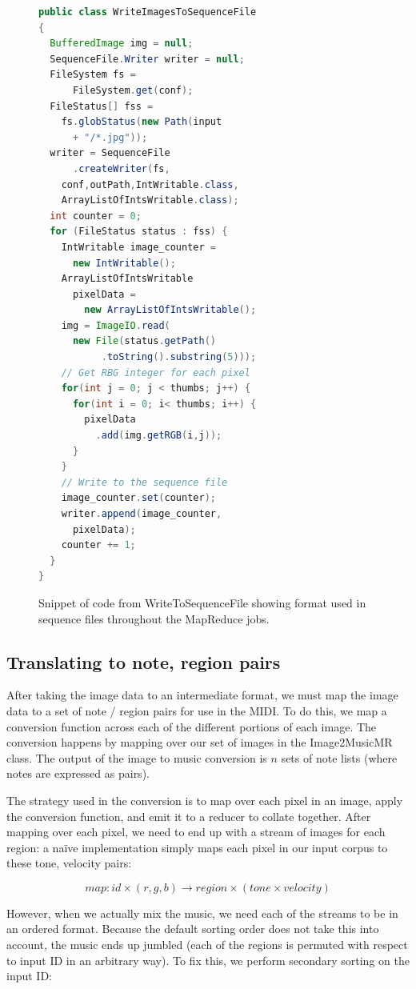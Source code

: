 \documentclass[10pt, conference, compsocconf]{IEEEtran}
\newcommand{\code}[1]{\textsf{\small #1}}
\begin{document}
\begin{figure}
\begin{lstlisting}[language=Java]
public class WriteImagesToSequenceFile
{
  BufferedImage img = null;
  SequenceFile.Writer writer = null;
  FileSystem fs = 
      FileSystem.get(conf);
  FileStatus[] fss = 
    fs.globStatus(new Path(input 
      + "/*.jpg"));
  writer = SequenceFile
      .createWriter(fs, 
    conf,outPath,IntWritable.class,
    ArrayListOfIntsWritable.class);
  int counter = 0;
  for (FileStatus status : fss) {
    IntWritable image_counter = 
      new IntWritable();
    ArrayListOfIntsWritable 
      pixelData = 
        new ArrayListOfIntsWritable();
    img = ImageIO.read(
      new File(status.getPath()
           .toString().substring(5)));
    // Get RBG integer for each pixel 
    for(int j = 0; j < thumbs; j++) {
      for(int i = 0; i< thumbs; i++) {
        pixelData
          .add(img.getRGB(i,j));
      }
    }
    // Write to the sequence file
    image_counter.set(counter);
    writer.append(image_counter,
      pixelData);
    counter += 1;
  } 
}
\end{lstlisting}
\caption{Snippet of code from \code{WriteToSequenceFile} showing
  format used in sequence files throughout the MapReduce jobs.}
\end{figure}

\subsection{Translating to note, region pairs}

After taking the image data to an intermediate format, we must map the
image data to a set of note / region pairs for use in the MIDI.  To do
this, we map a conversion function across each of the different
portions of each image.  The conversion happens by mapping over our
set of images in the \code{Image2MusicMR} class.  The output of the
image to music conversion is $n$ sets of note lists (where notes are
expressed as pairs).  

The strategy used in the conversion is to map over each pixel in an
image, apply the conversion function, and emit it to a reducer to
collate together.  After mapping over each pixel, we need to end up
with a stream of images for each region: a na\"{i}ve implementation simply
maps each pixel in our input corpus to these tone, velocity pairs:

\[
  map : id \times (r,g,b) \to region \times (tone \times velocity)
\]

However, when we actually mix the music, we need each of the streams
to be in an ordered format.  Because the default sorting order does
not take this into account, the music ends up jumbled (each of the
regions is permuted with respect to input ID in an arbitrary way).  To
fix this, we perform secondary sorting on the input ID:
\end{document}

